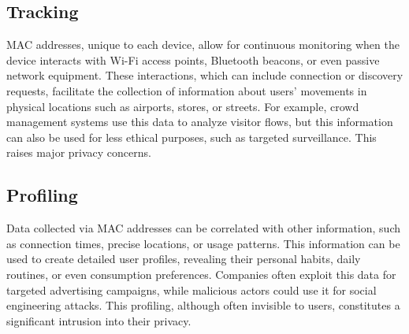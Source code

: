 \documentclass{article}
\begin{document}
  \subsection{\label{subsec:Tracking}Tracking}
  MAC addresses, unique to each device, allow for continuous monitoring when the 
  device interacts with Wi-Fi access points, Bluetooth beacons, or even passive network equipment.
  These interactions, which can include connection or discovery requests, facilitate 
  the collection of information about users' movements in physical locations such as airports,
  stores, or streets. For example, crowd management systems use this data to analyze visitor
  flows, but this information can also be used for less ethical purposes, such as targeted surveillance.
  This raises major privacy concerns.




  \subsection{\label{subsec:Profiling}Profiling}
  Data collected via MAC addresses can be correlated with other information, 
  such as connection times, precise locations, or usage patterns. This information
  can be used to create detailed user profiles, revealing their personal habits, daily routines,
  or even consumption preferences. Companies often exploit this data for targeted advertising campaigns,
  while malicious actors could use it for social engineering attacks. This profiling, 
  although often invisible to users, constitutes a significant intrusion into their privacy.
\end{document}
